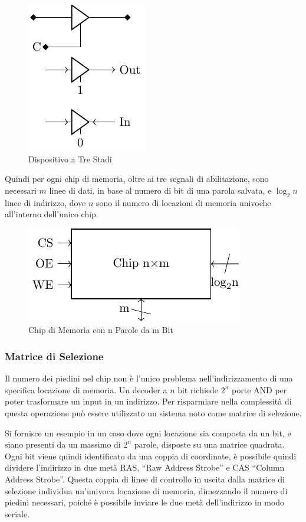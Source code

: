 \documentclass{article}
\numberwithin{equation}{subsection}
\begin{document}
\begin{figure}[H]%
    \centering%
    \includegraphics[scale=0.9]{dispositivo-3-stadi.pdf}%
    \caption{Dispositivo a Tre Stadi}%
\end{figure}

Quindi per ogni chip di memoria, oltre ai tre segnali di abilitazione, sono necessari $m$ linee di dati, in base al numero di bit di una parola salvata, e $\log_2n$ linee di indirizzo, dove $n$ sono il numero di 
locazioni di memoria univoche all'interno dell'unico chip. 

\begin{figure}[H]%
    \centering
    \includegraphics{chip-memoria-compatto.pdf}%
    \caption{Chip di Memoria con n Parole da m Bit}%
\end{figure}

\subsubsection{Matrice di Selezione}

Il numero dei piedini nel chip non è l'unico problema nell'indirizzamento di una specifica locazione di memoria. Un decoder a $n$ bit richiede $2^n$ porte AND per poter trasformare un 
input in un indirizzo. Per risparmiare nella complessità di questa operazione può essere utilizzato un sistema noto come matrice di selezione. 

Si fornisce un esempio in un caso dove ogni locazione sia composta da un bit, e siano presenti da un massimo di $2^n$ parole, disposte su una matrice quadrata. Ogni bit viene quindi identificato da una coppia di 
coordinate, è possibile quindi dividere l'indirizzo in due metà RAS, ``Raw Address Strobe'' e CAS ``Column Address Strobe''. Questa coppia di linee di controllo in uscita dalla matrice di selezione individua 
un'univoca locazione di memoria, dimezzando il numero di piedini necessari, poiché è possibile inviare le due metà dell'indirizzo in modo seriale. 
\end{document}
